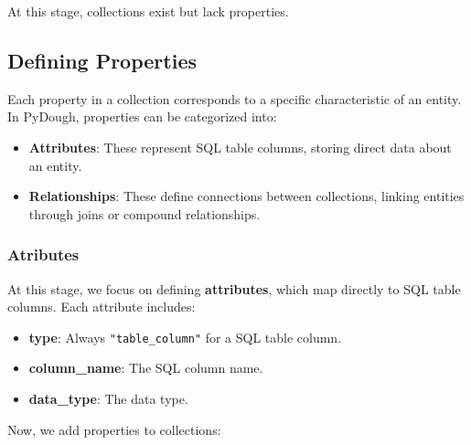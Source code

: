 \documentclass{article}
\begin{document}
At this stage, collections exist but lack properties.

\subsection{Defining Properties}
Each property in a collection corresponds to a specific characteristic of an entity. In PyDough, properties can be categorized into:
\begin{itemize}
    \item \textbf{Attributes}: These represent SQL table columns, storing direct data about an entity.
    \item \textbf{Relationships}: These define connections between collections, linking entities through joins or compound relationships.
\end{itemize}

\subsubsection{Atributes}

At this stage, we focus on defining \textbf{attributes}, which map directly to SQL table columns. Each attribute includes:
\begin{itemize}
    \item \textbf{type}: Always \texttt{"table\_column"} for a SQL table column.
    \item \textbf{column\_name}: The SQL column name.
    \item \textbf{data\_type}: The data type.
\end{itemize}

Now, we add properties to collections:
\end{document}
